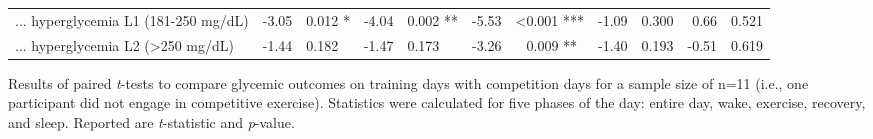 \documentclass[11pt,a4paper]{article}
\newcommand{\nl}[0]{\textcolor{white}{<}}
\begin{document}
\begin{threeparttable}
\begin{tabular}{@{}l rl rl rl rl rl@{}}
        \hspace{3mm} ... hyperglycemia L1 (181-250 mg/dL) & -3.05 &  0.012 * & -4.04 &  0.002 ** & -5.53 &   <0.001 *** & -1.09 &  0.300   &  0.66 &  0.521 \\
        \hspace{3mm} ... hyperglycemia L2 (>250 mg/dL)    & -1.44 &  0.182   & -1.47 &  0.173    & -3.26 & \nl0.009 **  & -1.40 &  0.193   & -0.51 &  0.619 \\
        \bottomrule
    \end{tabular}
    \begin{tablenotes}
    \item \footnotesize {Results of paired \textit{t}-tests to compare glycemic outcomes on training days with competition days for a sample size of n=11 (i.e., one participant did not engage in competitive exercise). Statistics were calculated for five phases of the day: entire day, wake, exercise, recovery, and sleep. Reported are \textit{t}-statistic and \textit{p}-value.}
    \end{tablenotes}
\end{threeparttable}
\end{document}
